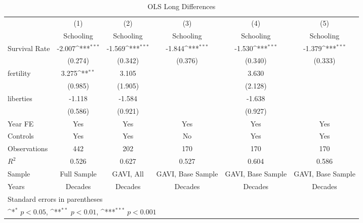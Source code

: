 \begin{table}[htbp]\centering
\def\sym#1{\ifmmode^{#1}\else\(^{#1}\)\fi}
\caption{OLS Long Differences}
\begin{tabular}{l*{5}{c}}
\toprule
                &\multicolumn{1}{c}{(1)}&\multicolumn{1}{c}{(2)}&\multicolumn{1}{c}{(3)}&\multicolumn{1}{c}{(4)}&\multicolumn{1}{c}{(5)}\\
                &\multicolumn{1}{c}{Schooling}&\multicolumn{1}{c}{Schooling}&\multicolumn{1}{c}{Schooling}&\multicolumn{1}{c}{Schooling}&\multicolumn{1}{c}{Schooling}\\
\midrule
Survival Rate   &   -2.007\sym{***}&   -1.569\sym{***}&   -1.844\sym{***}&   -1.530\sym{***}&   -1.379\sym{***}\\
                &  (0.274)         &  (0.342)         &  (0.376)         &  (0.340)         &  (0.333)         \\
\addlinespace
fertility       &    3.275\sym{**} &    3.105         &                  &    3.630         &                  \\
                &  (0.985)         &  (1.905)         &                  &  (2.128)         &                  \\
\addlinespace
liberties       &   -1.118         &   -1.584         &                  &   -1.638         &                  \\
                &  (0.586)         &  (0.921)         &                  &  (0.927)         &                  \\
\addlinespace
Year FE         &      Yes         &      Yes         &      Yes         &      Yes         &      Yes         \\
\addlinespace
Controls        &      Yes         &      Yes         &       No         &      Yes         &      Yes         \\
\midrule
Observations    &      442         &      202         &      170         &      170         &      170         \\
\(R^{2}\)       &    0.526         &    0.627         &    0.527         &    0.604         &    0.586         \\
Sample          &Full Sample         &GAVI, All         &GAVI, Base Sample         &GAVI, Base Sample         &GAVI, Base Sample         \\
Years           &  Decades         &  Decades         &  Decades         &  Decades         &  Decades         \\
\bottomrule
\multicolumn{6}{l}{\footnotesize Standard errors in parentheses}\\
\multicolumn{6}{l}{\footnotesize \sym{*} \(p<0.05\), \sym{**} \(p<0.01\), \sym{***} \(p<0.001\)}\\
\end{tabular}
\end{table}

